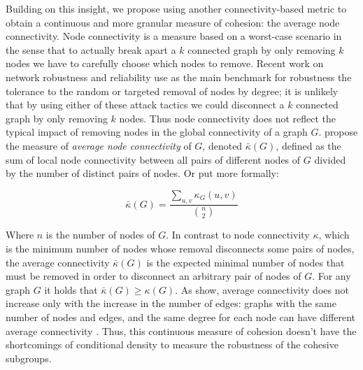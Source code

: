 Building on this insight, we propose using another connectivity-based metric to obtain a continuous and more granular measure of cohesion: the average node connectivity. Node connectivity is a measure based on a worst-case scenario in the sense that to actually break apart a $k$ connected graph by only removing $k$ nodes we have to carefully choose which nodes to remove. Recent work on network robustness and reliability \citep*{albert:2000,dodds:2003} use as the main benchmark for robustness the tolerance to the random or targeted removal of nodes by degree; it is unlikely that by using either of these attack tactics we could disconnect a $k$ connected graph by only removing $k$ nodes. Thus node connectivity does not reflect the typical impact of removing nodes in the global connectivity of a graph $G$. \citet*{beineke:2002} propose the measure of \emph{average node connectivity} of $G$, denoted $\bar{\kappa}(G)$, defined as the sum of local node connectivity between all pairs of different nodes of $G$ divided by the number of distinct pairs of nodes. Or put more formally:

\begin{equation}
\bar{\kappa}(G) = \frac{\sum_{u,v} \kappa_{G}(u,v)}{{n \choose 2}}
\end{equation}

Where $n$ is the number of nodes of $G$. In contrast to node connectivity $\kappa$, which is the minimum number of nodes whose removal disconnects some pairs of nodes, the average connectivity $\bar{\kappa}(G)$ is the expected minimal number of nodes that must be removed in order to disconnect an arbitrary pair of nodes of $G$. For any graph $G$ it holds that $\bar{\kappa}(G) \ge \kappa(G)$. As \citeauthor{beineke:2002} show, average connectivity does not increase only with the increase in the number of edges: graphs with the same number of nodes and edges, and the same degree for each node can have different average connectivity \citep[figure 2, 33]{beineke:2002}. Thus, this continuous measure of cohesion doesn't have the shortcomings of conditional density to measure the robustness of the cohesive subgroups.

